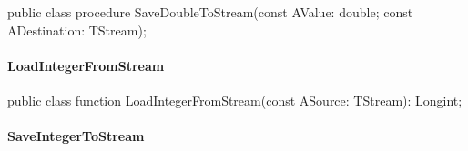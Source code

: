 \documentclass{report}
\newif\ifpdf
\begin{document}
\label{PasDoc_Serialize.TSerializable-SaveDoubleToStream}
\begin{list}{}{
\setlength{\itemindent}{0cm}
\setlength{\listparindent}{0cm}
\setlength{\leftmargin}{\evensidemargin}
\addtolength{\leftmargin}{\tmplength}
\settowidth{\labelsep}{X}
\addtolength{\leftmargin}{\labelsep}
\setlength{\labelwidth}{\tmplength}
}
\item[\textbf{Declaration}\hfill]
\ifpdf
\begin{flushleft}
\fi
\begin{ttfamily}
public class procedure SaveDoubleToStream(const AValue: double; const ADestination: TStream);\end{ttfamily}

\ifpdf
\end{flushleft}
\fi

\end{list}
\paragraph*{LoadIntegerFromStream}\hspace*{\fill}

\label{PasDoc_Serialize.TSerializable-LoadIntegerFromStream}
\begin{list}{}{
\setlength{\itemindent}{0cm}
\setlength{\listparindent}{0cm}
\setlength{\leftmargin}{\evensidemargin}
\addtolength{\leftmargin}{\tmplength}
\settowidth{\labelsep}{X}
\addtolength{\leftmargin}{\labelsep}
\setlength{\labelwidth}{\tmplength}
}
\item[\textbf{Declaration}\hfill]
\ifpdf
\begin{flushleft}
\fi
\begin{ttfamily}
public class function LoadIntegerFromStream(const ASource: TStream): Longint;\end{ttfamily}

\ifpdf
\end{flushleft}
\fi

\end{list}
\paragraph*{SaveIntegerToStream}\hspace*{\fill}
\end{document}
